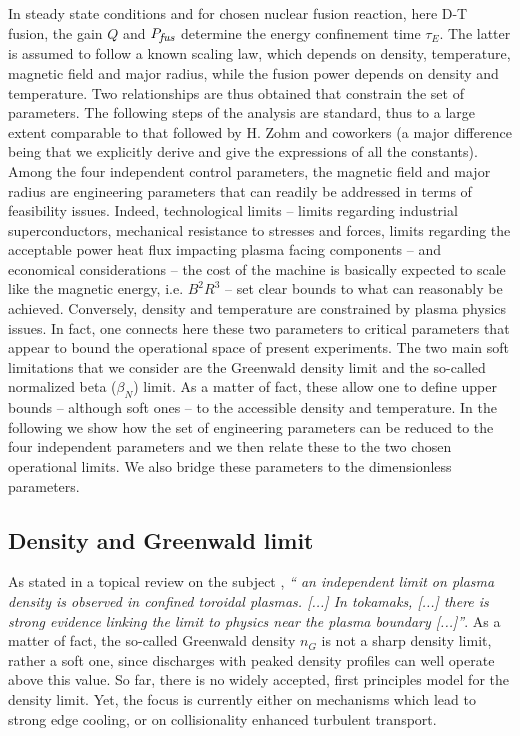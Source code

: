 \documentclass[12pt]{iopart}
\newcommand{\Pfus}{{P_{\textrm{\it\footnotesize fus}}}}
\begin{document}
In steady state conditions and for chosen nuclear fusion reaction, here D-T fusion, the gain $Q$ and $\Pfus$ determine the energy confinement time $\tau_E$. The latter is assumed to follow a known scaling law, which depends on density, temperature, magnetic field and major radius, while the fusion power depends on density and temperature. Two relationships are thus obtained that constrain the set of parameters. The following steps of the analysis are standard, thus to a large extent comparable to that followed by H. Zohm and coworkers \cite{Zohm2017} (a major difference being that we explicitly derive and give the expressions of all the constants). 
Among the four independent control parameters, the magnetic field and major radius are engineering parameters that can readily be addressed in terms of feasibility issues. Indeed, technological limits -- limits regarding industrial superconductors, mechanical resistance to stresses and forces, limits regarding the acceptable power heat flux impacting plasma facing components \cite{Siccinio2018} -- and economical considerations -- the cost of the machine is basically expected to scale like the magnetic energy, i.e. $B^2 R^3$ -- set clear bounds to what can reasonably be achieved. Conversely, density and temperature are constrained by plasma physics issues. In fact, one connects here these two parameters to critical parameters that appear to bound the operational space of present experiments. The two main soft limitations that we consider are the Greenwald density limit and the so-called normalized beta ($\beta_N$) limit. As a matter of fact, these allow one to define upper bounds -- although soft ones -- to the accessible density and temperature. In the following we show how the set of engineering parameters can be reduced to the four independent parameters and we then relate these to the two chosen operational limits. We also bridge these parameters to the dimensionless parameters.


\subsection{Density and Greenwald limit} \label{subsec:density_Greenwald}

As stated in a topical review on the subject \cite{Greenwald2002}, \emph{``%
an independent limit on plasma density is observed in confined toroidal plasmas. [...] In tokamaks, [...] there is strong evidence linking the limit to physics near the plasma boundary [...]''}. As a matter of fact, the so-called Greenwald density $n_G$ is not a sharp density limit, rather a soft one, since discharges with peaked density profiles can well operate above this value. So far, there is no widely accepted, first principles model for the density limit. Yet, the focus is currently either on mechanisms which lead to strong edge cooling, or on collisionality enhanced turbulent transport.
\end{document}
